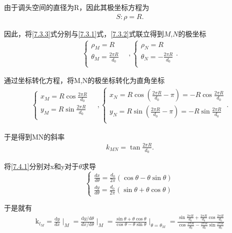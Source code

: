 \documentclass[../main.tex]{subfiles}
\begin{document}
\par 由于调头空间的直径为R，因此其极坐标方程为
\begin{align}
S:\rho =R. \label{7.3.3} 
\end{align}
\par 因此，将\eqref{7.3.3}式分别与\eqref{7.3.1}式，\eqref{7.3.2}式联立得到$M$,$N$的极坐标
\begin{gather}\label{1.........40}
\begin{cases}
\rho _M=R\\
\theta _M=\frac{2\pi R}{d_0}\\
\end{cases}
\quad,
\begin{cases}
\rho _N=R\\
\theta _N=-\frac{2\pi R}{d_0}\\
\end{cases}.
\end{gather}
\par 通过坐标转化方程，将M,N的极坐标转化为直角坐标
\begin{gather}\label{1.........42}
\begin{cases}
x_M = R\cos\frac{2\pi R}{d_0}\\
y_M = R\sin\frac{2\pi R}{d_0}\\
\end{cases}
\quad,
\begin{cases}
x_N = R\cos(\frac{2\pi R}{d_0}-\pi)= - R\cos\frac{2\pi R}{d_0}\\
y_N = R\sin(\frac{2\pi R}{d_0}-\pi)= - R\sin\frac{2\pi R}{d_0}
    \\
\end{cases}.
\end{gather}
\par 于是得到MN的斜率
\begin{align}
k_{MN}=\tan\frac{2\pi R}{d_0}.\label{7.3.4}
\end{align}
\par 将\eqref{7.4.1}分别对x和y对于$\theta $求导
\[
\begin{cases}\label{1.........44}
\frac{dx}{d\theta} = \frac{d_0}{2\pi} (\cos\theta - \theta\sin\theta) \\
\frac{dy}{d\theta} = \frac{d_0}{2\pi} (\sin\theta + \theta\cos\theta)
\end{cases}
\]
\par 于是就有
\begin{align}\label{1.........45}
    \text{k}_{l_M}=\frac{\text{d}y}{dx}\mid _{M}^{}=\frac{\text{d}y/\text{d}\theta}{dx/\text{d}\theta}\mid _{M}^{}=\frac{\sin \theta +\theta \cos \theta}{\cos \theta -\theta \sin \theta}\mid _{\theta =\theta _M}^{}=\frac{\sin \frac{2\pi R}{d_0}+\frac{2\pi R}{d_0}\cos \frac{2\pi R}{d_0}}{\cos \frac{2\pi R}{d_0}-\frac{2\pi R}{d_0}\sin \frac{2\pi R}{d_0}}
\end{align}
\end{document}
